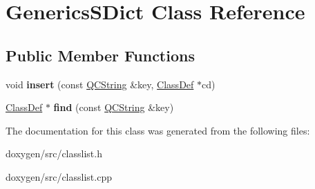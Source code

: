 \hypertarget{class_generics_s_dict}{}\section{Generics\+S\+Dict Class Reference}
\label{class_generics_s_dict}
\subsection*{Public Member Functions}
\begin{DoxyCompactItemize}
\item 
\mbox{\label{class_generics_s_dict_aac43e0eb1ec8d38c4826ab65cb95b5e1}} 
void {\bfseries insert} (const \mbox{\hyperlink{class_q_c_string}{Q\+C\+String}} \&key, \mbox{\hyperlink{class_class_def}{Class\+Def}} $\ast$cd)
\item 
\mbox{\label{class_generics_s_dict_a7d97631f266cc9878165deb96fb495d0}} 
\mbox{\hyperlink{class_class_def}{Class\+Def}} $\ast$ {\bfseries find} (const \mbox{\hyperlink{class_q_c_string}{Q\+C\+String}} \&key)
\end{DoxyCompactItemize}


The documentation for this class was generated from the following files\+:\begin{DoxyCompactItemize}
\item 
doxygen/src/classlist.\+h\item 
doxygen/src/classlist.\+cpp\end{DoxyCompactItemize}
